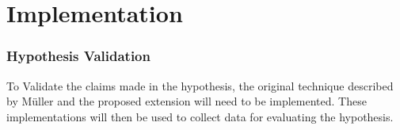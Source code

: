 \chapter{Implementation}

\subsection{Hypothesis Validation}

To Validate the claims made in the hypothesis, the original technique described by Müller \etal and
the proposed extension will need to be implemented. These implementations will then be used to 
collect data for evaluating the hypothesis.






